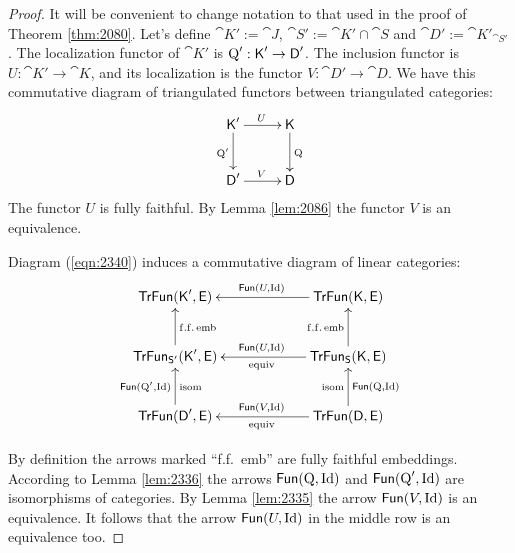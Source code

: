 \begin{proof}
It will be convenient to change notation to that used in the proof of Theorem 
\ref{thm:2080}. Let's define 
$\cat{K}' := \cat{J}$, $\cat{S}' := \cat{K}' \cap \cat{S}$ and
$\cat{D}' := \cat{K}'_{\cat{S}'}$. 
The localization functor of $\cat{K}'$ is 
$\operatorname{Q}' : \operatorname{\mathsf{K}}' \to \operatorname{\mathsf{D}}'$. 
The inclusion functor is 
$U : \cat{K}' \to \cat{K}$, and its localization is the functor
$V : \cat{D}' \to \cat{D}$.
We have this commutative diagram of triangulated functors between 
triangulated categories:
\begin{equation} \label{eqn:2340}
\UseTips \xymatrix @C=6ex @R=6ex {
\cat{K}'
\ar[r]^{U}
\ar[d]_{\opn{Q}'}
&
\cat{K}
\ar[d]^{\opn{Q}}
\\
\cat{D}'
\ar[r]^{V}
&
\cat{D}
} 
\end{equation}
The functor $U$ is fully faithful. 
By Lemma \ref{lem:2086} the functor $V$ is an equivalence.

Diagram (\ref{eqn:2340}) induces a commutative diagram of linear categories:
\begin{equation} \label{eqn:2346}
\UseTips \xymatrix @C=14ex @R=6ex {
\cat{TrFun}(\cat{K}', \cat{E})
&
\cat{TrFun}(\cat{K}, \cat{E})
\ar[l]_{\cat{Fun}(U, \opn{Id})}
\\
\cat{TrFun}_{\cat{S}'}(\cat{K}', \cat{E})
\ar[u]_{\mrm{f.f.\, emb}}
&
\cat{TrFun}_{\cat{S}}(\cat{K}, \cat{E})
\ar[u]^{\mrm{f.f.\, emb}}
\ar[l]^{\mrm{equiv}}_{\cat{Fun}(U, \opn{Id})}
\\
\cat{TrFun}(\cat{D}', \cat{E})
\ar[u]^{\cat{Fun}(\opn{Q}', \opn{Id})}_{\mrm{isom}}
&
\cat{TrFun}(\cat{D}, \cat{E})
\ar[l]_{\cat{Fun}(V, \opn{Id})}^{\mrm{equiv}}
\ar[u]_{\cat{Fun}(\opn{Q}, \opn{Id})}^{\mrm{isom}}
} 
\end{equation}

\noindent By definition the arrows marked ``f.f.\ emb'' are fully faithful 
embeddings. According to Lemma \ref{lem:2336}  the arrows 
$\operatorname{\mathsf{Fun}}(\operatorname{Q}, \operatorname{Id})$ and $\operatorname{\mathsf{Fun}}(\operatorname{Q}', \operatorname{Id})$
are isomorphisms of categories. By Lemma \ref{lem:2335} the 
arrow $\operatorname{\mathsf{Fun}}(V, \operatorname{Id})$ is an equivalence. 
It follows that the arrow $\operatorname{\mathsf{Fun}}(U, \operatorname{Id})$ in the middle row is an 
equivalence too. 


\end{proof}
